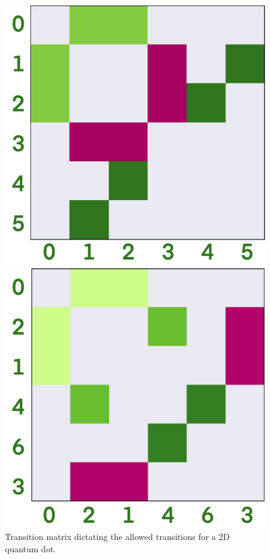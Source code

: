 \begin{figure}
    \begin{center}
    \begin{minipage}{0.4\textwidth}
        \centering
        \includegraphics[width=\textwidth]{results/figures/dipole_no_b.png}
        \caption{Transition matrix dictating the allowed transitions for a
            2D quantum dot.}
        \label{fig:transition_no_b}
    \end{minipage}
    \begin{minipage}{0.4\textwidth}
        \includegraphics[width=\textwidth]{results/figures/dipole_yes_b.png}

\end{minipage}
\end{center}
\end{figure}

